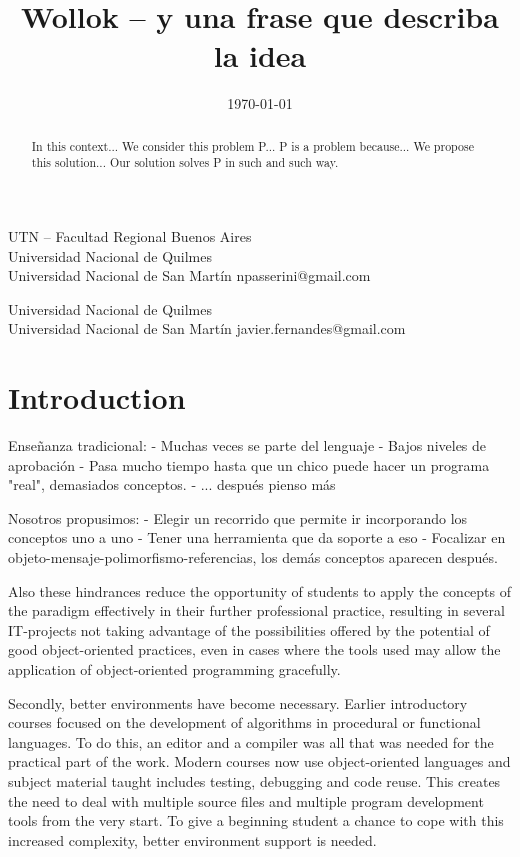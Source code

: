 \documentclass[preprint,10pt]{sigplanconf}
\begin{document}
\title{Wollok -- y una frase que describa la idea}
  {UTN -- Facultad Regional Buenos Aires \\ Universidad Nacional de Quilmes \\ Universidad Nacional de San Martín}
  {npasserini@gmail.com}
  
  {Universidad Nacional de Quilmes \\ Universidad Nacional de San Martín}
  {javier.fernandes@gmail.com}

\date{\today}
\maketitle

\begin{abstract}
In this context...
We consider this problem P...
P is a problem because...
We propose this solution...
Our solution solves P in such and such way.
\end{abstract}


\section{Introduction}
\label{sec:intro}


Enseñanza tradicional:
- Muchas veces se parte del lenguaje
- Bajos niveles de aprobación
- Pasa mucho tiempo hasta que un chico puede hacer un programa "real", demasiados conceptos.
- ... después pienso más

Nosotros propusimos:
- Elegir un recorrido que permite ir incorporando los conceptos uno a uno
- Tener una herramienta que da soporte a eso
- Focalizar en objeto-mensaje-polimorfismo-referencias, los demás conceptos aparecen después.


Also these hindrances reduce the opportunity of students to apply
the concepts of the paradigm effectively in their further
professional practice, resulting in several IT-projects not taking
advantage of the possibilities offered by the potential of good
object-oriented practices, even in cases where the tools used may
allow the application of object-oriented programming gracefully. \cite{lombardi_instances_2007}

Secondly, better environments have become necessary. Earlier introductory courses
focused on the development of algorithms in procedural or functional languages. To
do this, an editor and a compiler was all that was needed for the practical part of the
work. Modern courses now use object-oriented languages and subject material
taught includes testing, debugging and code reuse. This creates the need to deal with
multiple source files and multiple program development tools from the very start. To
give a beginning student a chance to cope with this increased complexity, better
environment support is needed. \cite{kolling_problem_1999}
\end{document}
